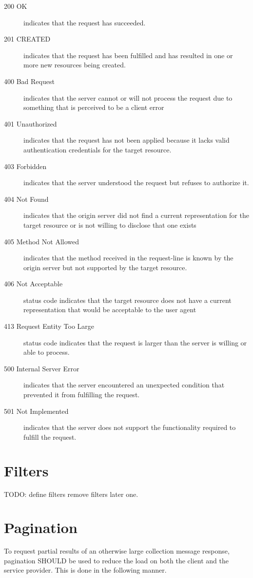 \documentclass[10pt,a4paper]{article}
\begin{document}
\begin{description}
\item[200 OK] indicates that the request has succeeded.
\item[201 CREATED] indicates that the request has been fulfilled and has resulted in one or more new resources being created.
\item[400 Bad Request] indicates that the server cannot or will not process the request due to something that is perceived to be a client error
\item[401 Unauthorized] indicates that the request has not been applied because it lacks valid authentication credentials for the target resource.
\item[403 Forbidden] indicates that the server understood the request but refuses to authorize it.
\item[404 Not Found] indicates that the origin server did not find a current representation for the target resource or is not willing to disclose that one exists
\item[405 Method Not Allowed] indicates that the method received in the request-line is known by the origin server but not supported by the target resource.
\item[406 Not Acceptable] status code indicates that the target resource does not have a current representation that would be acceptable to the user agent
\item[413 Request Entity Too Large] status code indicates that the request is larger than the server is willing or able to process.
\item[500 Internal Server Error] indicates that the server encountered an unexpected condition that prevented it from fulfilling the request.
\item[501 Not Implemented] indicates that the server does not support the functionality required to fulfill the request.
\end{description}

\section{Filters}

TODO: define filters
remove filters later one.

\section{Pagination}

To request partial results of an otherwise large collection message response, pagination SHOULD be used to reduce the load on 
both the client and the service provider. This is done in the following manner.
\end{document}

